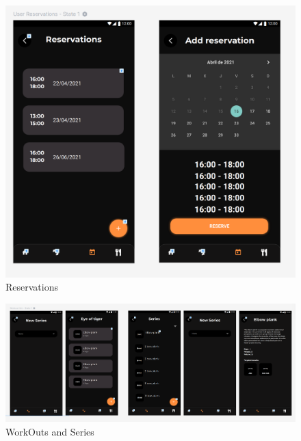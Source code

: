 \documentclass[12pt,a4paper]{article}
\begin{document}
\begin{figure}[h]
  \centering
 \includegraphics[width=1\textwidth]{reservas}
 \caption{Reservations}
\end{figure}

\begin{figure}[h]
  \centering
 \includegraphics[width=1\textwidth]{workout-series}
 \caption{WorkOuts and Series}
\end{figure}
\end{document}
